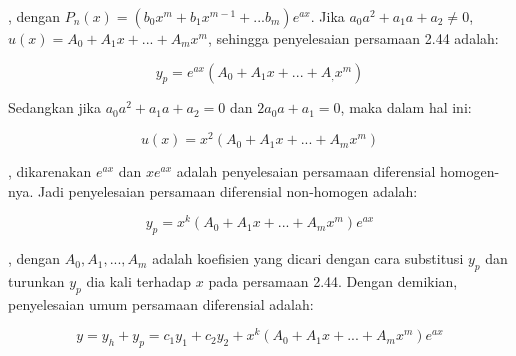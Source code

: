 \begin{enumerate}[1.]
	, dengan \begin{math} P_n (x) = (b_0 x^{m} + b_1 x^{m - 1} + ... b_m) e^{ax} \end{math}. Jika \begin{math} a_0 a^{2} + a_1 a + a_2 \neq 0 \end{math}, \begin{math} u(x) = A_0 + A_1 x + ... + A_m x^{m} \end{math}, sehingga penyelesaian persamaan 2.44 adalah:

	\begin{equation} y_p = e^{ax} (A_0 + A_1 x + ... + A_, x^{m}) \end{equation}

	Sedangkan jika \begin{math} a_0 a^{2} + a_1 a + a_2 = 0 \end{math} dan \begin{math} 2 a_0 a + a_1 = 0 \end{math}, maka dalam hal ini:

	\begin{displaymath} u(x) = x^{2} (A_0 + A_1 x + ... + A_m x^{m}) \end{displaymath}
	
	, dikarenakan \begin{math} e^{ax} \end{math} dan \begin{math} xe^{ax} \end{math} adalah penyelesaian persamaan diferensial homogen-nya. Jadi penyelesaian persamaan diferensial non-homogen adalah:

	\begin{equation} y_p = x^{k} (A_0 + A_1 x + ... + A_m x^{m}) e^{ax} \end{equation}

	, dengan \begin{math} A_0, A_1, ..., A_m \end{math} adalah koefisien yang dicari dengan cara substitusi \begin{math} y_p \end{math} dan turunkan \begin{math} y_p \end{math} dia kali terhadap \begin{math} x \end{math} pada persamaan 2.44. Dengan demikian, penyelesaian umum persamaan diferensial adalah:

	\begin{equation} y = y_h + y_p = c_1 y_1 + c_2 y_2 + x^{k} (A_0 + A_1 x + ... + A_m x^{m}) e^{ax} \end{equation}


\end{enumerate}
